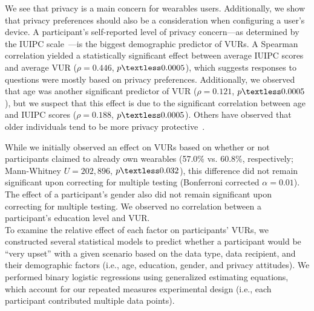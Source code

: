 \documentclass[conference]{IEEEtran}
\begin{document}
We see that privacy is a main concern for wearables users. Additionally, we show that privacy preferences should also be a consideration when configuring a user's device. A participant's self-reported level of privacy concern---as determined by the IUIPC scale~\cite{malhotra2004internet}---is the biggest demographic predictor of VURs. A Spearman correlation yielded a statistically significant effect between average IUIPC scores and average VUR ($\rho=0.446$, $p\textless0.0005$), which suggests responses to questions were mostly based on privacy preferences. Additionally, we observed that age was another significant predictor of VUR ($\rho=0.121$, $p\textless0.0005$), but we suspect that this effect is due to the significant correlation between age and IUIPC scores ($\rho=0.188$, $p\textless0.0005$). Others have observed that older individuals tend to be more privacy protective~\cite{varian2005demographics}.

While we initially observed an effect on VURs based on whether or not participants claimed to already own wearables (57.0\% vs. 60.8\%, respectively; Mann-Whitney $U=202,896$, $p\textless0.032$), this difference did not remain significant upon correcting for multiple testing (Bonferroni corrected $\alpha=0.01$). The effect of a participant's gender also did not remain significant upon correcting for multiple testing. We observed no correlation between a participant's education level and VUR.\\

\label{sec:regression}
To examine the relative effect of each factor on participants' VURs, we constructed several statistical models to predict whether a participant would be ``very upset'' with a given scenario based on the data type, data recipient, and their demographic factors (i.e., age, education, gender, and privacy attitudes). We performed binary logistic regressions using generalized estimating equations, which account for our repeated measures experimental design (i.e., each participant contributed multiple data points).
\end{document}
